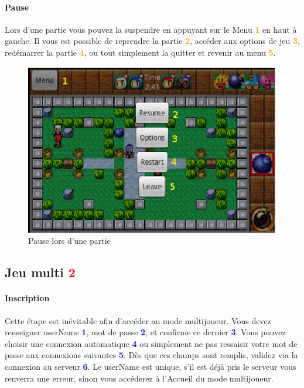 	\paragraph{Pause\\}
	Lors d'une partie vous pouvez la suspendre en appuyant sur le Menu
	\textcolor{orange}{\textbf{1}} en haut à gauche. Il vous est possible de
	reprendre la partie \textcolor{orange}{\textbf{2}}, accéder aux options de jeu
	\textcolor{orange}{\textbf{3}}, redémarrer la partie
	\textcolor{orange}{\textbf{4}}, ou tout simplement la quitter et revenir au
	menu \textcolor{orange}{\textbf{5}}. 
	
	\begin{figure}[H]
	\centering
		\includegraphics[scale=0.7]{Manuel/Img/20}
		\caption{Pause lors d'une partie}
	\end{figure}


\subsection{Jeu multi \textcolor{red}{2}}

	\paragraph{Inscription}
	Cette étape est inévitable afin d'accéder au mode multijoueur. Vous devez
	renseigner userName \textcolor{blue}{\textbf{1}}, mot de passe
	\textcolor{blue}{\textbf{2}}, et confirme ce dernier
	\textcolor{blue}{\textbf{3}}. Vous pouvez choisir une connexion automatique
	\textcolor{blue}{\textbf{4}} ou simplement ne pas ressaisir votre mot de passe
	aux connexions suivantes \textcolor{blue}{\textbf{5}}. Dès que ces champs sont
	remplis, validez via la connexion au serveur \textcolor{blue}{\textbf{6}}. Le
	userName est unique, s'il est déjà pris le serveur vous renverra une erreur,
	sinon vous accéderez à l'Accueil du mode multijoueur.
	
